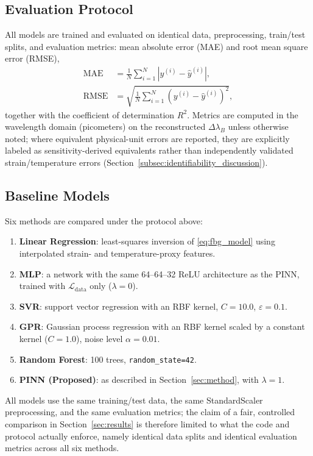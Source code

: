 \documentclass[journal,twoside,web]{ieeecolor}
\begin{document}
\subsection{Evaluation Protocol}

All models are trained and evaluated on identical data, preprocessing,
train/test splits, and evaluation metrics: mean absolute error (MAE) and
root mean square error (RMSE),
\begin{align}
\text{MAE} &= \frac{1}{N}\sum_{i=1}^{N}\left|y^{(i)}-\hat y^{(i)}\right|, \\
\text{RMSE} &= \sqrt{\frac{1}{N}\sum_{i=1}^{N}\left(y^{(i)}-\hat y^{(i)}\right)^2},
\end{align}
together with the coefficient of determination $R^2$. Metrics are computed
in the wavelength domain (picometers) on the reconstructed
$\Delta\lambda_B$ unless otherwise noted; where equivalent physical-unit
errors are reported, they are explicitly labeled as sensitivity-derived
equivalents rather than independently validated strain/temperature errors
(Section~\ref{subsec:identifiability_discussion}).

\subsection{Baseline Models}
\label{subsec:baselines}

Six methods are compared under the protocol above:
\begin{enumerate}
\item \textbf{Linear Regression}: least-squares inversion of
\eqref{eq:fbg_model} using interpolated strain- and temperature-proxy
features.
\item \textbf{MLP}: a network with the same 64--64--32 ReLU architecture as
the PINN, trained with $\mathcal{L}_{\text{data}}$ only ($\lambda=0$).
\item \textbf{SVR}: support vector regression with an RBF kernel,
$C=10.0$, $\varepsilon=0.1$.
\item \textbf{GPR}: Gaussian process regression with an RBF kernel scaled
by a constant kernel ($C=1.0$), noise level $\alpha=0.01$.
\item \textbf{Random Forest}: 100 trees, \texttt{random\_state=42}.
\item \textbf{PINN (Proposed)}: as described in Section~\ref{sec:method},
with $\lambda=1$.
\end{enumerate}
All models use the same training/test data, the same StandardScaler
preprocessing, and the same evaluation metrics; the claim of a fair,
controlled comparison in Section~\ref{sec:results} is therefore limited to
what the code and protocol actually enforce, namely identical data splits
and identical evaluation metrics across all six methods.
\end{document}
